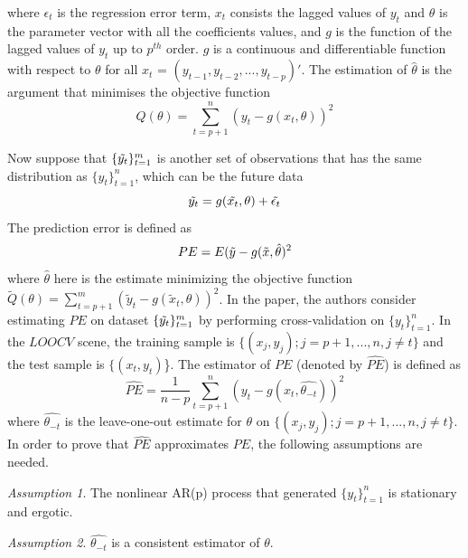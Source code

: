 \documentclass[12pt, oneside]{amsart}
\theoremstyle{definition}
\theoremstyle{remark}
\numberwithin{equation}{section}
\begin{document}
where $\epsilon_t$ is the regression error term, $x_t$ consists the lagged values of $y_t$ and $\theta$ is the parameter vector with all the coefficients values, and $g$ is the function of the lagged values of $y_t$ up to $p^{th}$ order.  $g$ is a continuous and differentiable function with respect to $\theta$ for all $x_t$ = $(y_{t-1}, y_{t-2}, ..., y_{t-p})'$. The estimation of $\hat{\theta}$ is the argument that minimises the objective function
\begin{equation}\label{eq2}
Q(\theta) = \sum_{t=p+1}^{n}
(y_t - g(x_t, \theta))^2
\end{equation}

Now suppose that $\{\Tilde{y_t}\}^m_{t=1}$ is another set of observations that has the same distribution as $\{{y_t}\}^n_{t=1}$, which can be the future data
\begin{equation}\label{eq3}
\Tilde{y_t} = g(\Tilde{x_t}, \theta) + \Tilde{\epsilon_t}
\end{equation}
The prediction error is defined as
\begin{equation}\label{eq4}
    PE = E(\Tilde{y} - g(\Tilde{x},\hat{\theta})^2
\end{equation}
where $\hat{\theta}$ here is the estimate minimizing the objective function $\tilde{Q}(\theta) = \sum_{t=p+1}^{m}
(\tilde{y}_t - g(\tilde{x}_t, \theta))^2$.
In the paper, the authors consider estimating $PE$ on dataset $\{\Tilde{y_t}\}^m_{t=1}$ by performing cross-validation on $\{y_t\}^n_{t=1}$. In the $LOOCV$ scene,  the training sample is $\{(x_j
, y_j); j = p+1,...,n, j \not = t\}$ and the test sample is $\{(x_t
, y_t)$\}. The estimator of $PE$ (denoted by $\hat{PE}$)  is defined as
\begin{equation}\label{eq5}
\hat{PE} = \frac{1}{n-p} \sum_{t=p+1}^n \left( y_t - g(x_t,\hat{\theta_{-t}}) \right)^2
\end{equation}
where $\hat{\theta_{-t}}$ is the leave-one-out estimate for $\theta$ on $\{(x_j, y_j); j = p+1,...,n, j \not = t\}$. In order to prove that $\hat{PE}$ approximates $PE$, the following assumptions are needed.

\newtheorem{assumption}{Assumption}
\begin{assumption}\label{assump1}
    The nonlinear AR(p) process that generated $\{{y_t}\}^n_{t=1}$ is stationary and ergotic.
\end{assumption}

\begin{assumption}\label{assump2}
    $\hat{\theta_{-t}}$ is a consistent estimator of $\theta$.
\end{assumption}
\end{document}
